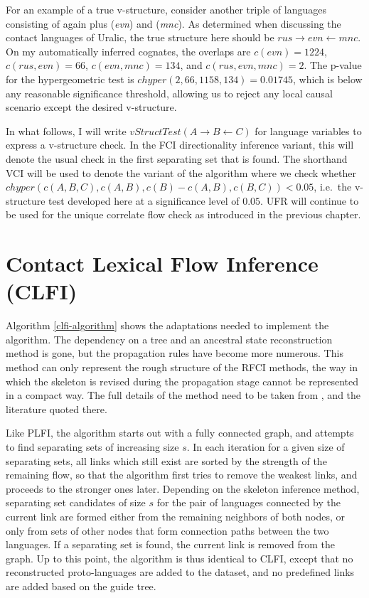 For an example of a true v-structure, consider another triple of languages consisting of again  plus  (\textit{evn}) and  (\textit{mnc}). As determined when discussing the contact languages of Uralic, the true structure here should be $rus \rightarrow evn \leftarrow mnc$. On my automatically inferred cognates, the overlaps are $c(evn) = 1224$, $c(rus,evn) = 66$, $c(evn,mnc) = 134$, and $c(rus,evn,mnc) = 2$. The p-value for the hypergeometric test is $chyper(2, 66, 1158, 134) = 0.01745$, which is below any reasonable significance threshold, allowing us to reject any local causal scenario except the desired v-structure.

In what follows, I will write $vStructTest(A \rightarrow B \leftarrow C)$ for language variables to express a v-structure check. In the FCI directionality inference variant, this will denote the usual check in the first separating set that is found. The shorthand VCI will be used to denote the variant of the algorithm where we check whether $chyper(c(A,B,C),c(A,B),c(B)-c(A,B),c(B,C)) < 0.05$, i.e.\ the v-structure test developed here at a significance level of $0.05$. UFR will continue to be used for the unique correlate flow check as introduced in the previous chapter.

\section{Contact Lexical Flow Inference (CLFI)}\label{sec:7.5}
Algorithm \ref{clfi-algorithm} shows the adaptations needed to implement the  algorithm. The dependency on a tree and an ancestral state reconstruction method is gone, but the propagation rules have become more numerous. This method can only represent the rough structure of the RFCI methods, the way in which the skeleton is revised during the propagation stage cannot be represented in a compact way. The full details of the method need to be taken from , and the literature quoted there.

Like PLFI, the algorithm starts out with a fully connected graph, and attempts to find separating sets of increasing size $s$. In each iteration for a given size of separating sets, all links which still exist are sorted by the strength of the remaining flow, so that the algorithm first tries to remove the weakest links, and proceeds to the stronger ones later. Depending on the skeleton inference method, separating set candidates of size $s$ for the pair of languages connected by the current link are formed either from the remaining neighbors of both nodes, or only from sets of other nodes that form connection paths between the two languages. If a separating set is found, the current link is removed from the graph. Up to this point, the algorithm is thus identical to CLFI, except that no reconstructed proto-languages are added to the dataset, and no predefined links are added based on the guide tree.

